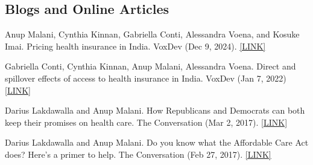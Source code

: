 \documentclass[11pt,letterpaper]{report}
\begin{document}
    \subsection*{Blogs and Online Articles}

    \begin{tablist}

        \item[2024] \tab{}Anup Malani, Cynthia Kinnan, Gabriella Conti, Alessandra Voena, and Kosuke Imai.  Pricing health insurance in India.  VoxDev (Dec 9, 2024).  \href{https://voxdev.org/topic/public-economics/pricing-health-insurance-india}{[LINK]}
        
        Gabriella Conti, Cynthia Kinnan, Anup Malani, Alessandra Voena.  Direct and spillover effects of access to health insurance in India.  VoxDev (Jan 7, 2022) \href{https://voxdev.org/topic/health/direct-and-spillover-effects-access-health-insurance-india}{[LINK]}
        
        \item[2017] \tab{}Darius Lakdawalla and Anup Malani.  How Republicans and Democrats can both keep their promises on health care.  The Conversation (Mar 2, 2017).  \href{https://theconversation.com/how-republicans-and-democrats-can-both-keep-their-promises-on-health-care-70974?sa=pg2&sq=Malani&sr=3}{[LINK]} 
        
        \item[2017] \tab{}Darius Lakdawalla and Anup Malani. Do you know what the Affordable Care Act does? Here’s a primer to help.  The Conversation (Feb 27, 2017). \href{https://theconversation.com/do-you-know-what-the-affordable-care-act-does-heres-a-primer-to-help-73736?sa=pg2&sq=Malani&sr=1}{[LINK]}
        
    \end{tablist}




\end{document}
